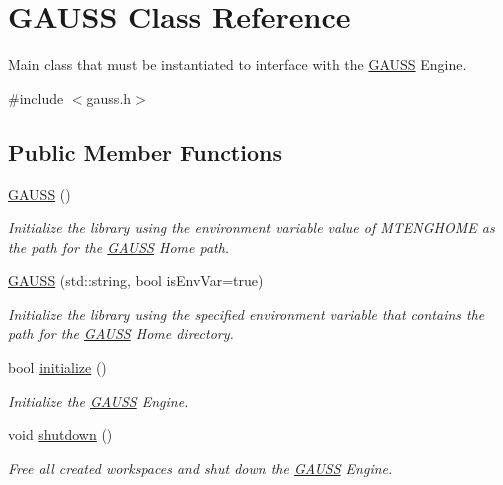 \hypertarget{class_g_a_u_s_s}{}\section{G\+A\+U\+SS Class Reference}
\label{class_g_a_u_s_s}


Main class that must be instantiated to interface with the \hyperlink{class_g_a_u_s_s}{G\+A\+U\+SS} Engine.  




{\ttfamily \#include $<$gauss.\+h$>$}

\subsection*{Public Member Functions}
\begin{DoxyCompactItemize}
\item 
\hyperlink{class_g_a_u_s_s_a693f5380e15621bb955989e243b902cd}{G\+A\+U\+SS} ()
\begin{DoxyCompactList}\small\item\em Initialize the library using the environment variable value of {\ttfamily M\+T\+E\+N\+G\+H\+O\+ME} as the path for the \hyperlink{class_g_a_u_s_s}{G\+A\+U\+SS} Home path. \end{DoxyCompactList}\item 
\hyperlink{class_g_a_u_s_s_a6983f26bb2c4f8852cb18ed31198fdb1}{G\+A\+U\+SS} (std\+::string, bool is\+Env\+Var=true)
\begin{DoxyCompactList}\small\item\em Initialize the library using the specified environment variable that contains the path for the \hyperlink{class_g_a_u_s_s}{G\+A\+U\+SS} Home directory. \end{DoxyCompactList}\item 
bool \hyperlink{class_g_a_u_s_s_aad9f7a3a527b9c5961d1cc1b1aa9066c}{initialize} ()
\begin{DoxyCompactList}\small\item\em Initialize the \hyperlink{class_g_a_u_s_s}{G\+A\+U\+SS} Engine. \end{DoxyCompactList}\item 
void \hyperlink{class_g_a_u_s_s_a71721c595c12c94616ef414879c95460}{shutdown} ()
\begin{DoxyCompactList}\small\item\em Free all created workspaces and shut down the \hyperlink{class_g_a_u_s_s}{G\+A\+U\+SS} Engine. \end{DoxyCompactList}\item 

\end{DoxyCompactItemize}
